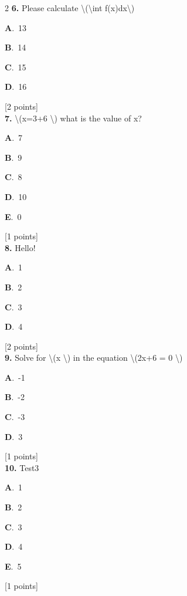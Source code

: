 \documentclass[12pt]{article}
\newcommand{\choice}[3]{%
  \noindent\textbf{#1}.~#2\hfill#3\par\vspace{0.25em}
}
\begin{document}
\begin{multicols}{2}
\noindent \textbf{\textenglish{6.}} {\textenglish{Please calculate \textbackslash{}(\textbackslash{}int f(x)dx\textbackslash{})}}

\noindent\choice{A}{{\textenglish{13}}}{}
\noindent\choice{B}{{\textenglish{14}}}{}
\noindent\choice{C}{{\textenglish{15}}}{}
\noindent\choice{D}{{\textenglish{16}}}{}
\hfill {\textenglish{[2 points]}}\\[0.5em]

\noindent \textbf{\textenglish{7.}} {\textenglish{\textbackslash{}(x=3+6 \textbackslash{}) what is the value of x?}}

\noindent\choice{A}{{\textenglish{7}}}{}
\noindent\choice{B}{{\textenglish{9}}}{}
\noindent\choice{C}{{\textenglish{8}}}{}
\noindent\choice{D}{{\textenglish{10}}}{}
\noindent\choice{E}{{\textenglish{0}}}{}
\hfill {\textenglish{[1 points]}}\\[0.5em]

\noindent \textbf{\textenglish{8.}} {\textenglish{Hello!}}

\noindent\choice{A}{{\textenglish{1}}}{}
\noindent\choice{B}{{\textenglish{2}}}{}
\noindent\choice{C}{{\textenglish{3}}}{}
\noindent\choice{D}{{\textenglish{4}}}{}
\hfill {\textenglish{[2 points]}}\\[0.5em]

\noindent \textbf{\textenglish{9.}} {\textenglish{Solve for \textbackslash{}(x \textbackslash{}) in the equation \textbackslash{}(2x+6 = 0 \textbackslash{})}}

\noindent\choice{A}{{\textenglish{-1}}}{}
\noindent\choice{B}{{\textenglish{-2}}}{}
\noindent\choice{C}{{\textenglish{-3}}}{}
\noindent\choice{D}{{\textenglish{3}}}{}
\hfill {\textenglish{[1 points]}}\\[0.5em]

\noindent \textbf{\textenglish{10.}} {\textenglish{Test3}}

\noindent\choice{A}{{\textenglish{1}}}{}
\noindent\choice{B}{{\textenglish{2}}}{}
\noindent\choice{C}{{\textenglish{3}}}{}
\noindent\choice{D}{{\textenglish{4}}}{}
\noindent\choice{E}{{\textenglish{5}}}{}
\hfill {\textenglish{[1 points]}}\\[0.5em]


\end{multicols}
\end{document}
